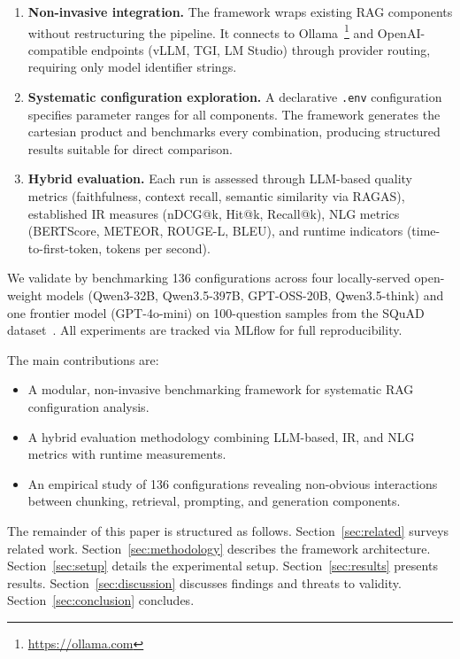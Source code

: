 \begin{enumerate}
  \item \textbf{Non-invasive integration.} The framework wraps existing RAG components without restructuring the pipeline. It connects to Ollama~\footnote{\url{https://ollama.com}} and OpenAI-compatible endpoints (vLLM, TGI, LM Studio) through provider routing, requiring only model identifier strings.
  \item \textbf{Systematic configuration exploration.} A declarative \texttt{.env} configuration specifies parameter ranges for all components. The framework generates the cartesian product and benchmarks every combination, producing structured results suitable for direct comparison.
  \item \textbf{Hybrid evaluation.} Each run is assessed through LLM-based quality metrics (faithfulness, context recall, semantic similarity via RAGAS), established IR measures (nDCG@k, Hit@k, Recall@k), NLG metrics (BERTScore, METEOR, ROUGE-L, BLEU), and runtime indicators (time-to-first-token, tokens per second).
\end{enumerate}

We validate \toolname{} by benchmarking 136 configurations across four locally-served open-weight models (Qwen3-32B, Qwen3.5-397B, GPT-OSS-20B, Qwen3.5-think) and one frontier model (GPT-4o-mini) on 100-question samples from the SQuAD dataset~\cite{rajpurkar2016squad}. All experiments are tracked via MLflow for full reproducibility.

The main contributions are:
\begin{itemize}
  \item A modular, non-invasive benchmarking framework for systematic RAG configuration analysis.
  \item A hybrid evaluation methodology combining LLM-based, IR, and NLG metrics with runtime measurements.
  \item An empirical study of 136 configurations revealing non-obvious interactions between chunking, retrieval, prompting, and generation components.
\end{itemize}

The remainder of this paper is structured as follows. Section~\ref{sec:related} surveys related work. Section~\ref{sec:methodology} describes the framework architecture. Section~\ref{sec:setup} details the experimental setup. Section~\ref{sec:results} presents results. Section~\ref{sec:discussion} discusses findings and threats to validity. Section~\ref{sec:conclusion} concludes.
